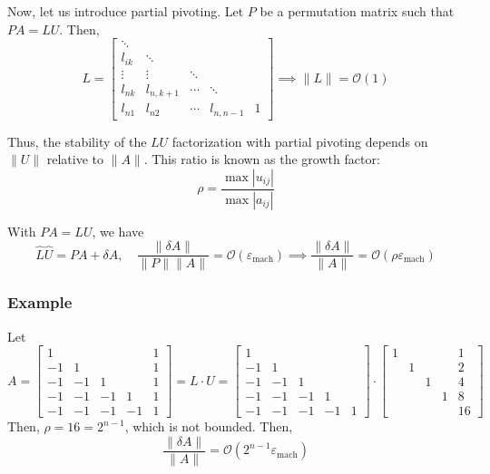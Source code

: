 \documentclass[11pt]{article}
\begin{document}
Now, let us introduce partial pivoting. Let \(P\) be a permutation matrix such that \(PA = LU\). Then,
\[L = \begin{bmatrix}
    \ddots & & & & \\
    l_{ik} & \ddots & & & \\
    \vdots & \vdots & \ddots & & \\
    l_{nk} & l_{n,k+1} & \cdots & \ddots & \\
    l_{n1} & l_{n2} & \cdots & l_{n,n-1} & 1
\end{bmatrix} \implies \|L\| = \mathcal{O}(1)\]

Thus, the stability of the \(LU\) factorization with partial pivoting depends on \(\|U\|\) relative to \(\|A\|\). This ratio is known as the growth factor:
\[\rho = \frac{\max |u_{ij}|}{\max |a_{ij}|}\]

With \(PA = LU\), we have
\[\hat{L} \hat{U} = PA + \delta A, \quad \frac{\|\delta A\|}{\|P\| \|A\|} = \mathcal{O}(\varepsilon_{\text{mach}}) \implies \frac{\|\delta A\|}{\|A\|} = \mathcal{O}(\rho \varepsilon_{\text{mach}})\]

\subsubsection*{Example}
Let
\[A = \begin{bmatrix}
    1 & & & & 1 \\
    -1 & 1 & & & 1 \\
    -1 & -1 & 1 & & 1 \\
    -1 & -1 & -1 & 1 & 1 \\
    -1 & -1 & -1 & -1 & 1
\end{bmatrix} = L \cdot U = \begin{bmatrix}
    1 & & & & \\
    -1 & 1 & & & \\
    -1 & -1 & 1 & & \\
    -1 & -1 & -1 & 1 & \\
    -1 & -1 & -1 & -1 & 1
\end{bmatrix} \cdot \begin{bmatrix}
    1 & & & & 1 \\
    & 1 & & & 2 \\
    & & 1 & & 4 \\
    & & & 1 & 8 \\
    & & & & 16
\end{bmatrix}\]
Then, \(\rho = 16 = 2^{n-1}\), which is not bounded. Then,
\[\frac{\|\delta A\|}{\|A\|} = \mathcal{O}(2^{n-1} \varepsilon_{\text{mach}})\]
\end{document}

